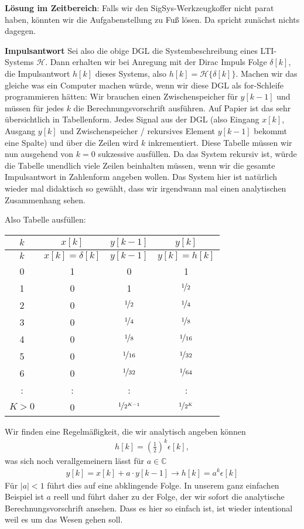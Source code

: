 \begin{Ansatz}
\textbf{Lösung im Zeitbereich}:
Falls wir den SigSys-Werkzeugkoffer nicht parat haben, könnten wir die
Aufgabenstellung zu Fuß lösen. Da spricht zunächst nichts dagegen.

\textbf{Impulsantwort}
Sei also die obige DGL die Systembeschreibung eines LTI-Systems $\mathcal{H}$.
Dann erhalten wir bei Anregung mit der Dirac Impuls Folge $\delta[k]$, die Impulsantwort $h[k]$
dieses Systems, also $h[k] = \mathcal{H}\{\delta[k]\}$. Machen wir das gleiche
was ein Computer machen würde, wenn wir diese DGL als for-Schleife programmieren
hätten: Wir brauchen einen Zwischenspeicher für $y[k-1]$ und müssen für jedes
$k$ die Berechnungsvorschrift ausführen. Auf Papier ist das sehr übersichtlich
in Tabellenform. Jedes Signal aus der DGL (also Eingang $x[k]$, Ausgang $y[k]$
und Zwischenspeicher / rekursives Element $y[k-1]$ bekommt eine Spalte) und
über die Zeilen wird $k$ inkrementiert. Diese Tabelle müssen wir nun ausgehend
von $k=0$ sukzessive ausfüllen. Da das System rekursiv ist, würde die Tabelle
unendlich viele Zeilen beinhalten müssen, wenn wir die gesamte Impulsantwort
in Zahlenform angeben wollen. Das System hier ist natürlich wieder mal didaktisch
so gewählt, dass wir irgendwann mal einen analytischen Zusammenhang sehen.

Also Tabelle ausfüllen:
\begin{center}
\begin{tabular}{||c | c | c | c||}
\hline
$k$ & $x[k]$ & $y[k-1]$ & $y[k]$ \\
\hline\hline
$k$ & $x[k]=\delta[k]$ & $y[k-1]$ & $y[k] = h[k]$ \\
\hline
0 & 1 & 0 & 1  \\\hline
1 & 0 & 1  & $\nicefrac{1}{2}$ \\\hline
2 & 0 & $\nicefrac{1}{2}$ & $\nicefrac{1}{4}$ \\\hline
3 & 0 & $\nicefrac{1}{4}$ & $\nicefrac{1}{8}$ \\\hline
4 & 0 & $\nicefrac{1}{8}$ & $\nicefrac{1}{16}$ \\\hline
5 & 0 & $\nicefrac{1}{16}$ & $\nicefrac{1}{32}$ \\\hline
6 & 0 & $\nicefrac{1}{32}$ & $\nicefrac{1}{64}$ \\\hline
: & : & : & : \\\hline
$K > 0$ & 0 & $\nicefrac{1}{2^{K-1}}$ & $\nicefrac{1}{2^K}$ \\\hline
\end{tabular}
\end{center}
Wir finden eine Regelmäßigkeit, die wir analytisch angeben können
\begin{align}
h[k] = \left(\frac{1}{2}\right)^k \epsilon[k],
\end{align}
was sich noch verallgemeinern lässt für $a\in\mathbb{C}$
\begin{align}
y[k] = x[k] + a \cdot y[k-1] \rightarrow h[k] = a^k \epsilon[k]
\end{align}
Für $|a|<1$ führt dies auf eine abklingende Folge. In unserem ganz einfachen
Beispiel ist $a$ reell und führt daher zu der Folge, der wir sofort die
analytische Berechnungsvorschrift ansehen. Dass es hier so einfach ist, ist
wieder intentional weil es um das Wesen gehen soll.


\end{Ansatz}
